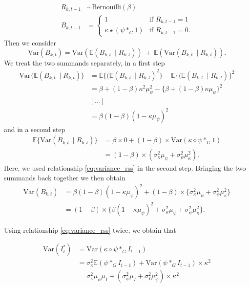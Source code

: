 \documentclass{article}
\begin{document}
\begin{align}
R_{k, t - 1} & \sim \text{Bernouilli}(\beta)\\
B_{k, t - 1} & = \begin{cases}
1 & \text{if } R_{k, t - 1} = 1\\ %
\kappa \star (\psi *_G 1) & \text{if } R_{k, t - 1} = 0. %
\label{eq:Z_t_i}
\end{cases}
\end{align} 
Then we consider
$$
\text{Var}(B_{k, t}) = \text{Var}(\mathbb{E}(B_{k, t} \ \mid R_{k, t})) \ + \ \mathbb{E}(\text{Var}(B_{k, t} \ \mid R_{k, t})).
$$
We treat the two summands separately, in a first step
\begin{align*}
\text{Var}\{\mathbb{E}(B_{k, t} \ \mid R_{k, t})\} & = \mathbb{E}\{(\mathbb{E}(B_{k, t} \ \mid R_{k, t})^2\} - \mathbb{E}\{(\mathbb{E}(B_{k, t} \ \mid R_{k, t})\}^2\\
& = \beta + (1 - \beta)\kappa^2\mu_\psi^2 - \{\beta + (1 - \beta)\kappa\mu_\psi\}^2\\
& [...]\\
& = \beta(1 - \beta)(1 - \kappa\mu_\psi)^2
\end{align*}
and in a second step
\begin{align*}
\mathbb{E}\{\text{Var}(B_{k, t} \ \mid R_{k, t})\} & = \beta \times 0 + (1 - \beta)\times \text{Var}(\kappa \diamond \psi *_G 1)\\
& = (1 - \beta) \times (\sigma^2_\kappa\mu_\psi + \sigma^2_\psi\mu_\kappa^2).
\end{align*}
Here, we used relationship \eqref{eq:variance_rss} in the second step. Bringing the two summands back together we then obtain
\begin{align*}
\text{Var}(B_{k, t}) & = \beta(1 - \beta)(1 - \kappa\mu_\psi)^2 + (1 - \beta) \times \{\sigma^2_\kappa\mu_\psi + \sigma^2_\psi\mu_\kappa^2\}\\
& = (1 - \beta) \times \{\beta (1 - \kappa\mu_\psi)^2 + \sigma^2_\kappa\mu_\psi + \sigma^2_\psi\mu_\kappa^2\}.
\end{align*}

Using relationship \eqref{eq:variance_rss} twice, we obtain that

\begin{align*}
\text{Var}(I^*_t) & = \text{Var}(\kappa \diamond \psi *_G I_{t - 1})\\
& = \sigma^2_\kappa \mathbb{E}(\psi *_G I_{t - 1}) + \text{Var}(\psi *_G I_{t - 1}) \times \kappa^2\\
& = \sigma^2_\kappa\mu_\psi \mu_I + (\sigma^2_\psi\mu_I + \sigma^2_I\mu_\psi^2)\times\kappa^2
\end{align*}
\end{document}
